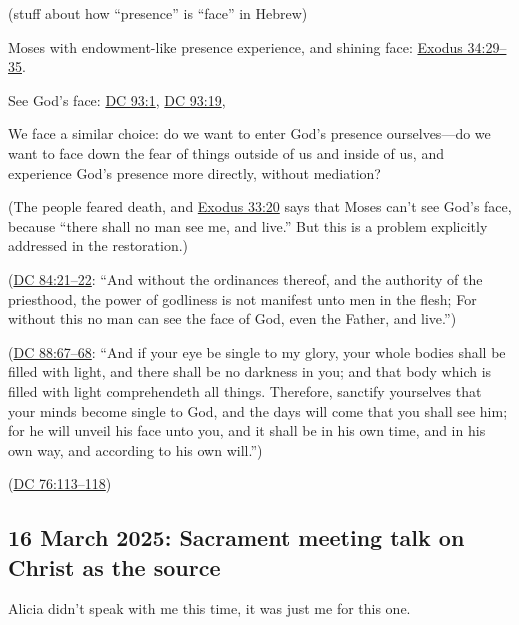 \begin{compactitem}
\begin{compactitem}
\begin{compactitem}
\begin{compactitem}
									\item (stuff about how ``presence'' is ``face'' in Hebrew)
									\item Moses with endowment-like presence experience, and shining face: \hyperref[EXODUS-34-29]{Exodus 34:29--35}.
									\item See God's face: \hyperref[DC93-1]{DC 93:1}, \hyperref[DC93-19]{DC 93:19}, 
									\item We face a similar choice: do we want to enter God's presence ourselves---do we want to face down the fear of things outside of us and inside of us, and experience God's presence more directly, without mediation?
									\item (The people feared death, and \hyperref[EXODUS-33-20]{Exodus 33:20} says that Moses can't see God's face, because ``there shall no man see me, and live.'' But this is a problem explicitly addressed in the restoration.)
									\item (\hyperref[DC84-21]{DC 84:21--22}: ``And without the ordinances thereof, and the authority of the priesthood, the power of godliness is not manifest unto men in the flesh; For without this no man can see the face of God, even the Father, and live.'')
									\item (\hyperref[DC88-67]{DC 88:67--68}: ``And if your eye be single to my glory, your whole bodies shall be filled with light, and there shall be no darkness in you; and that body which is filled with light comprehendeth all things. Therefore, sanctify yourselves that your minds become single to God, and the days will come that you shall see him; for he will unveil his face unto you, and it shall be in his own time, and in his own way, and according to his own will.'')
									\item (\hyperref[DC76-113]{DC 76:113--118})
								\end{compactitem}
						\end{compactitem}
				\end{compactitem}
		
		\end{compactitem}
	
	\subsection{16 March 2025: Sacrament meeting talk on Christ as the source}
		\label{TALKS-16-03-2025}
		
		Alicia didn't speak with me this time, it was just me for this one.
		
